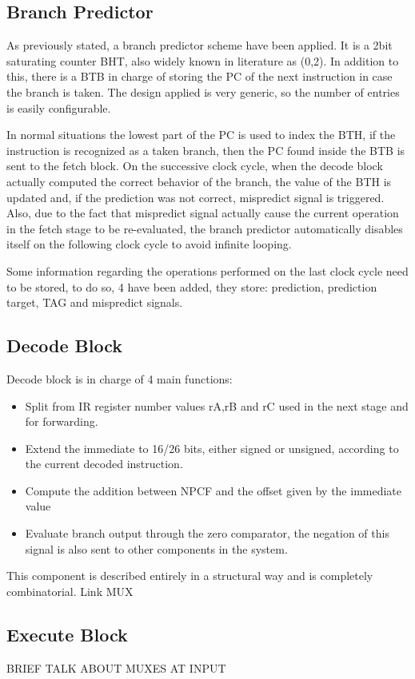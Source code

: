 \documentclass[12pt]{article}
\begin{document}
\subsection{Branch Predictor}
As previously stated, a branch predictor scheme have been applied.
It is a 2bit saturating counter BHT, also widely known in literature as (0,2). In addition to this, there is a BTB in charge of storing the PC of the next instruction in case the branch is taken.
The design applied is very generic, so the number of entries is easily configurable.

In normal situations the lowest part of the PC is used to index the BTH, if the instruction is recognized as a taken branch, then the PC found inside the BTB is sent to the fetch block. On the successive clock cycle, when the decode block actually computed the correct behavior of the branch, the value of the BTH is updated and, if the prediction was not correct, mispredict signal is triggered.
Also, due to the fact that mispredict signal actually cause the current operation in the fetch stage to be re-evaluated, the branch predictor automatically disables itself on the following clock cycle to avoid infinite looping.

Some information regarding the operations performed on the last clock cycle need to be stored, to do so, 4 have been added, they store: prediction, prediction target, TAG and mispredict signals.

\subsection{Decode Block}
Decode block is in charge of 4 main functions:
\begin{itemize}
	\item Split from IR register number values rA,rB and rC used in the next stage and for forwarding.
	\item Extend the immediate to 16/26 bits, either signed or unsigned, according to the current decoded instruction.
	\item Compute the addition between NPCF and the offset given by the immediate value
	\item Evaluate branch output through the zero comparator, the negation of this signal is also sent to other components in the system.
\end{itemize}
This component is described entirely in a structural way and is completely combinatorial.
Link MUX

\subsection{Execute Block}
BRIEF TALK ABOUT MUXES AT INPUT
\end{document}
